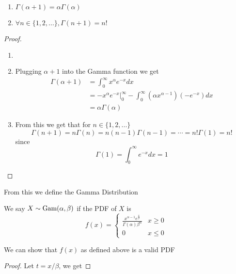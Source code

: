 \documentclass{report}
\begin{document}
\begin{theorem}
    $ $
    \begin{enumerate}
        \item $\Gamma(\alpha+1)=\alpha\Gamma(\alpha)$
        \item $\forall n\in\{1,2,...\},\Gamma(n+1)=n!$
    \end{enumerate}
    \begin{proof}
        \begin{enumerate}
            \item[]
            \item Plugging $\alpha+1$ into the Gamma function we get
            \begin{align*}
                \Gamma(\alpha+1) & = \int_0^\infty x^{\alpha} e^{-x} dx
                \\             & = -x^\alpha e^{-x}\Big\vert_0^\infty - \int_0^\infty (\alpha x^{\alpha-1}) (-e^{-x}) dx \tag{Using integration by parts}
                \\             & = \alpha \Gamma(\alpha)
            \end{align*}
            \item From this we get that for $n\in\{1,2,...\}$
            \[
                \Gamma(n+1)=n\Gamma(n)=n(n-1)\Gamma(n-1)= \cdots = n! \Gamma(1) = n!
            \]
            since
            \[
                \Gamma(1)=\int_0^\infty e^{-x} dx=1
            \]
        \end{enumerate}
    \end{proof}
\end{theorem}



From this we define the Gamma Distribution
\begin{definition}
    We say $X\sim\textup{Gam}(\alpha,\beta)$ if the PDF of $X$ is
    \[
        f(x)=\begin{cases}
            \displaystyle\frac {x^{\alpha-1} e^{\frac x \beta}}{\Gamma(\alpha)\beta^\alpha} & x \ge 0
            \\
            0 & x \le 0
        \end{cases}
    \]
\end{definition}
We can show that $f(x)$ as defined above is a valid PDF
\begin{proof}
    Let $t=x/\beta$, we get

\end{proof}
\end{document}
